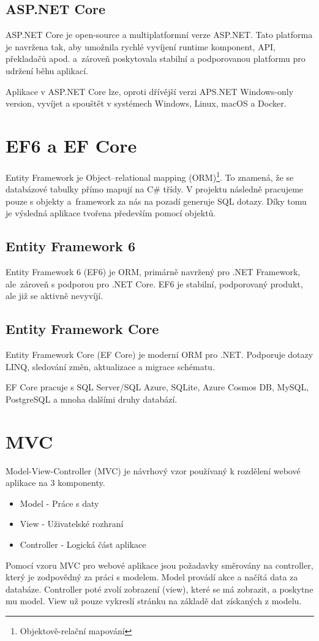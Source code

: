 \documentclass[a4paper, 12pt]{report}
\begin{document}
	\subsection{ASP.NET Core}
    ASP.NET Core je open-source a multiplatformní verze ASP.NET. Tato platforma je navržena tak, aby umožnila rychlé vyvíjení runtime komponent, API, překladačů apod. a~zároveň poskytovala stabilní a podporovanou platformu pro udržení běhu aplikací.\par
	Aplikace v ASP.NET Core lze, oproti dřívější verzi APS.NET Windows-only version, vyvíjet a spouštět v systémech Windows, Linux, macOS a Docker.\cite{ASP.NET_Core}

	\section{EF6 a EF Core}
    Entity Framework je Object–relational mapping (ORM)\footnote{Objektově-relační mapování}. To znamená, že se databázové tabulky přímo mapují na C\# třídy. V projektu následně pracujeme pouze s objekty a~framework za nás na pozadí generuje SQL dotazy. Díky tomu je výsledná aplikace tvořena především pomocí objektů.\cite{ASP.NET_Lekce8}

	\subsection{Entity Framework 6}
	Entity Framework 6 (EF6) je ORM, primárně navržený pro .NET Framework, ale~zároveň s podporou pro .NET Core. EF6 je stabilní, podporovaný produkt, ale již se aktivně nevyvíjí.\cite{EF6_EFCore}

	\subsection{Entity Framework Core}
	Entity Framework Core (EF Core) je moderní ORM pro .NET. Podporuje dotazy LINQ, sledování změn, aktualizace a migrace schématu.\par EF Core pracuje s SQL Server/SQL Azure, SQLite, Azure Cosmos DB, MySQL, PostgreSQL a mnoha dalšími druhy databází.\cite{EF6_EFCore}

	\section{MVC}
	Model-View-Controller (MVC) je návrhový vzor používaný k rozdělení webové aplikace na 3 komponenty.
	\begin{itemize}
		\item Model - Práce s daty
		\item View - Uživatelské rozhraní
		\item Controller - Logická část aplikace
	\end{itemize}\par
	Pomocí vzoru MVC pro webové aplikace jsou požadavky směrovány na controller, který je zodpovědný za práci s modelem. Model provádí akce a načítá data za databáze. Controller poté zvolí zobrazení (view), které se má zobrazit, a poskytne mu model. View už pouze vykreslí stránku na základě dat získaných z modelu.\cite{MVC}
\end{document}

